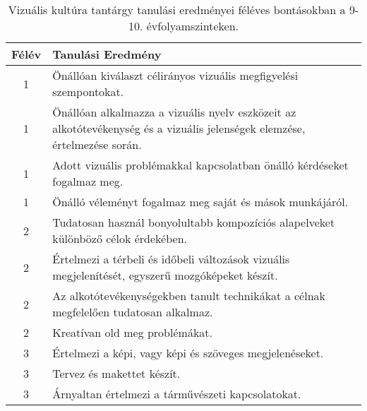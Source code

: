        
           \begin{longtable}{c | p{12cm} }
            \caption[Vizuális kultúra 9-10.]{Vizuális kultúra tantárgy tanulási eredményei féléves bontásokban a 9-10. évfolyamszinteken. }  \\

            \textbf{Félév} & \textbf{Tanulási Eredmény} \\
            \hline
            \endhead
                                
                                          1 &  Önállóan kiválaszt célirányos vizuális megfigyelési szempontokat. \\ \hline
                                          1 &  Önállóan alkalmazza a vizuális nyelv eszközeit az alkotótevékenység és a vizuális jelenségek elemzése, értelmezése során. \\ \hline
                                          1 &  Adott vizuális problémakkal kapcsolatban önálló kérdéseket fogalmaz meg. \\ \hline
                                          1 &  Önálló véleményt fogalmaz meg saját és mások munkájáról. \\ \hline
                                      
                                
                                          2 &  Tudatosan használ bonyolultabb kompozíciós alapelveket különböző célok érdekében. \\ \hline
                                          2 &  Értelmezi a térbeli és időbeli változások vizuális megjelenítését, egyszerű mozgóképeket készít. \\ \hline
                                          2 &  Az alkotótevékenységekben tanult technikákat a célnak megfelelően tudatosan alkalmaz. \\ \hline
                                          2 &  Kreatívan old meg problémákat. \\ \hline
                                      
                                
                                          3 &  Értelmezi a képi, vagy képi és szöveges megjelenéseket. \\ \hline
                                          3 &  Tervez és makettet készít. \\ \hline
                                          3 &  Árnyaltan értelmezi a tárművészeti kapcsolatokat. \\ \hline
                                      

\end{longtable}
